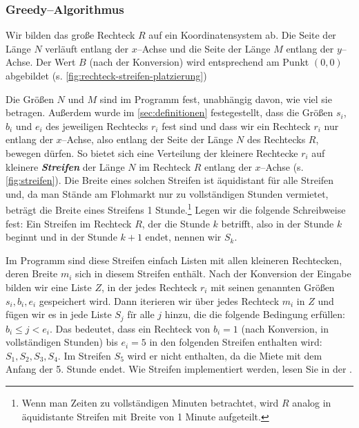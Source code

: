 \subsubsection{Greedy--Algorithmus}

Wir bilden das große Rechteck $R$ auf ein Koordinatensystem ab.
Die Seite der Länge $N$ verläuft entlang der $x$--Achse und die Seite der Länge
$M$ entlang der $y$--Achse.
Der Wert $B$ (nach der Konversion) wird entsprechend am Punkt $(0, 0)$ abgebildet (s. \cref{fig:rechteck-streifen-platzierung})

Die Größen $N$ und $M$ sind im Programm fest, unabhängig davon, wie viel sie betragen.
Außerdem wurde im \cref{sec:definitionen} festegestellt, dass die Größen $s_i$, $b_i$ und $e_i$
des jeweiligen Rechtecks $r_i$ fest sind und dass wir ein Rechteck $r_i$ nur entlang der $x$--Achse,
also entlang der Seite der Länge $N$ des Rechtecks $R$, bewegen dürfen.
So bietet sich eine Verteilung der kleinere Rechtecke $r_i$ auf kleinere \textit{\textbf{Streifen}}
der Länge $N$ im Rechteck $R$ entlang der $x$--Achse (s. \cref{fig:streifen}).
Die Breite eines solchen Streifen ist äquidistant für alle Streifen und, da
man Stände am Flohmarkt nur zu vollständigen Stunden vermietet, 
beträgt die Breite eines Streifens 1 Stunde.\footnote{Wenn man Zeiten zu
vollständigen Minuten betrachtet,
wird $R$ analog in äquidistante Streifen mit Breite von 1 Minute aufgeteilt.}
Legen wir die folgende Schreibweise fest: Ein Streifen im Rechteck $R$, der die
Stunde $k$ betrifft, also in der Stunde $k$ beginnt und in der Stunde $k+1$ endet, nennen wir $S_k$.


Im Programm sind diese Streifen einfach Listen mit allen kleineren Rechtecken, 
deren Breite $m_i$ sich in diesem Streifen enthält.
Nach der Konversion der Eingabe bilden wir eine Liste $Z$, in der jedes
Rechteck $r_i$ mit seinen genannten Größen $s_i, b_i, e_i$ gespeichert wird.
Dann iterieren wir über jedes Rechteck $m_i$ in $Z$ und fügen wir es in jede Liste $S_j$ fïr alle
$j$ hinzu, die die folgende Bedingung erfüllen: $b_i \leqslant j < e_i$.
Das bedeutet, dass ein Rechteck von $b_i = 1$ (nach Konversion, in vollständigen Stunden)
bis $e_i = 5$ in den folgenden Streifen enthalten wird: $S_1, S_2, S_3, S_4$. Im Streifen $S_5$
wird er nicht enthalten, da die Miete mit dem Anfang der 5. Stunde endet.
Wie Streifen implementiert werden, lesen Sie in der .


